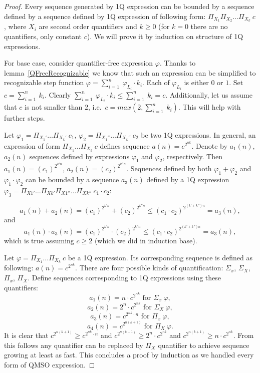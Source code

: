 \documentclass[12pt]{article}
\theoremstyle{definition}
\begin{document}
\begin{proof}
    Every sequence generated by 1Q expression can be bounded by a sequence defined by a sequence defined by 1Q expression of following form: $\Pi_{X_1}\Pi_{X_2}\ldots \Pi_{X_k} \ c$, where $X_i$ are second order quantifiers and $k \geq 0$ (for $k = 0$ there are no quantifiers, only constant $c$). We will prove it by induction on structure of 1Q expressions.

    For base case, consider quantifier-free expression $\varphi$. Thanks to lemma~\ref{QFreeRecognizable} we know that such an expression can be simplified to recognizable step function $\varphi = \sum_{i = 1}^{n} \ \varphi_{L_i} \cdot k_i$. Each of $\varphi_{L_i}$ is either $0$ or $1$. Set $c = \sum_{i=1}^n \ k_i$. Clearly $\sum_{i = 1}^{n} \ \varphi_{L_i} \cdot k_i \leq  \sum_{i=1}^n \ k_i = c$. Additionally, let us assume that $c$ is not smaller than $2$, i.e.\ $c = max(2, \sum_{i=1}^n \ k_i)$. This will help with further steps.

    Let $\varphi_1 = \Pi_{X_1'}\ldots \Pi_{X_k'} \ c_1$, $\varphi_2 = \Pi_{X_1''}\ldots \Pi_{X_k''} \ c_2$ be two 1Q expressions. In general, an expression of form $\Pi_{X_1}\ldots \Pi_{X_k} \ c$ defines sequence $a(n) = c^{2^{nk}}$. Denote by $a_1(n)$, $a_2(n)$ sequences defined by expressions $\varphi_1$ and $\varphi_2$, respectively. Then $a_1(n) = (c_1)^{2^{k'n}}$, $a_2(n) = (c_2)^{2^{k''n}}$. Sequences defined by both $\varphi_1 + \varphi_2$ and $\varphi_1 \cdot \varphi_2$ can be bounded by a sequence $a_3(n)$ defined by a 1Q expression $\varphi_3 = \Pi_{X1'} \ldots \Pi_{Xk'} \Pi_{X1''} \ldots \Pi_{Xk''} \ c_1 \cdot c_2$:

    $$a_1(n) + a_2(n) = (c_1)^{2^{k'n}} + (c_2)^{2^{k''n}} \leq (c_1 \cdot c_2)^{2^{(k' + k'')n}} = a_3(n),$$
    and
    $$a_1(n) \cdot a_3(n) = (c_1)^{2^{k'n}} \cdot (c_2)^{2^{k''n}} \leq (c_1 \cdot c_2)^{2^{(k' + k'')n}} = a_3(n),$$
    which is true assuming $c \geq 2$ (which we did in induction base).

    Let $\varphi = \Pi_{X_1}\ldots \Pi_{X_k} \ c$ be a 1Q expression. Its corresponding sequence is defined as following: $a(n) = c^{2^{nk}}$. There are four possible kinds of quantification: $\Sigma_x$, $\Sigma_X$, $\Pi_x$, $\Pi_X$. Define sequences corresponding to 1Q expressions using these quantifiers:
    $$a_1(n) = n \cdot c^{2^{nk}} \text{ for } \Sigma_x \ \varphi,$$
    $$a_2(n) = 2^n \cdot c^{2^{nk}} \text{ for } \Sigma_X \ \varphi,$$
    $$a_3(n) = c^{2^{nk} \cdot n} \text{ for } \Pi_x \ \varphi,$$
    $$a_4(n) = c^{2^{n(k+1)}} \text{ for } \Pi_X \ \varphi.$$
    It is clear that $c^{2^{n(k+1)}} \geq c^{2^{nk} \cdot n}$ and $c^{2^{n(k+1)}} \geq 2^n \cdot c^{2^{nk}}$ and $c^{2^{n(k+1)}} \geq n \cdot c^{2^{nk}}$. From this follows any quantifier can be replaced by $\Pi_X$ quantifier to achieve sequence growing at least as fast. This concludes a proof by induction as we handled every form of QMSO expression.


\end{proof}
\end{document}
